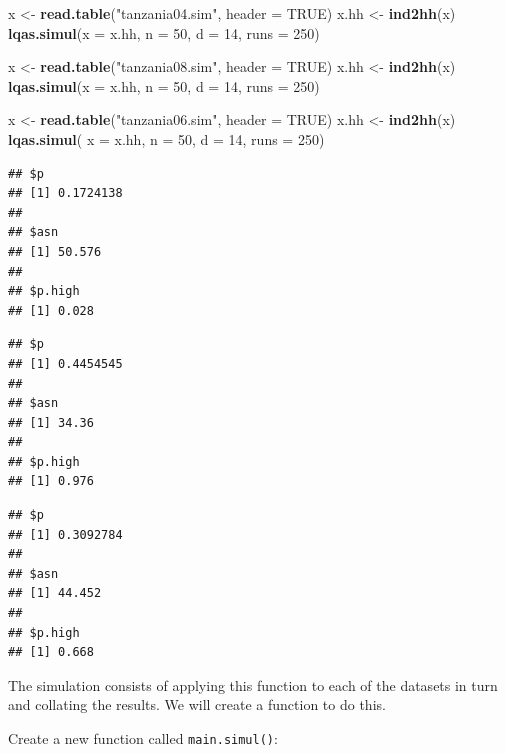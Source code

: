 \documentclass[12pt,a4paper]{book}
\newenvironment{Shaded}{\begin{snugshade}}{\end{snugshade}}
\newcommand{\DataTypeTok}[1]{\textcolor[rgb]{0.13,0.29,0.53}{#1}}
\newcommand{\DecValTok}[1]{\textcolor[rgb]{0.00,0.00,0.81}{#1}}
\newcommand{\KeywordTok}[1]{\textcolor[rgb]{0.13,0.29,0.53}{\textbf{#1}}}
\newcommand{\NormalTok}[1]{#1}
\newcommand{\OtherTok}[1]{\textcolor[rgb]{0.56,0.35,0.01}{#1}}
\newcommand{\StringTok}[1]{\textcolor[rgb]{0.31,0.60,0.02}{#1}}
\theoremstyle{definition}
\theoremstyle{definition}
\theoremstyle{definition}
\theoremstyle{remark}
\begin{document}
\begin{Shaded}
\begin{Highlighting}[]
\NormalTok{x <-}\StringTok{ }\KeywordTok{read.table}\NormalTok{(}\StringTok{"tanzania04.sim"}\NormalTok{, }\DataTypeTok{header =} \OtherTok{TRUE}\NormalTok{)}
\NormalTok{x.hh <-}\StringTok{ }\KeywordTok{ind2hh}\NormalTok{(x)}
\KeywordTok{lqas.simul}\NormalTok{(}\DataTypeTok{x =}\NormalTok{ x.hh, }\DataTypeTok{n =} \DecValTok{50}\NormalTok{, }\DataTypeTok{d =} \DecValTok{14}\NormalTok{, }\DataTypeTok{runs =} \DecValTok{250}\NormalTok{)}

\NormalTok{x <-}\StringTok{ }\KeywordTok{read.table}\NormalTok{(}\StringTok{"tanzania08.sim"}\NormalTok{, }\DataTypeTok{header =} \OtherTok{TRUE}\NormalTok{)}
\NormalTok{x.hh <-}\StringTok{ }\KeywordTok{ind2hh}\NormalTok{(x)}
\KeywordTok{lqas.simul}\NormalTok{(}\DataTypeTok{x =}\NormalTok{ x.hh, }\DataTypeTok{n =} \DecValTok{50}\NormalTok{, }\DataTypeTok{d =} \DecValTok{14}\NormalTok{, }\DataTypeTok{runs =} \DecValTok{250}\NormalTok{)}

\NormalTok{x <-}\StringTok{ }\KeywordTok{read.table}\NormalTok{(}\StringTok{"tanzania06.sim"}\NormalTok{, }\DataTypeTok{header =} \OtherTok{TRUE}\NormalTok{)}
\NormalTok{x.hh <-}\StringTok{ }\KeywordTok{ind2hh}\NormalTok{(x)}
\KeywordTok{lqas.simul}\NormalTok{( }\DataTypeTok{x =}\NormalTok{ x.hh, }\DataTypeTok{n =} \DecValTok{50}\NormalTok{, }\DataTypeTok{d =} \DecValTok{14}\NormalTok{, }\DataTypeTok{runs =} \DecValTok{250}\NormalTok{)}
\end{Highlighting}
\end{Shaded}

\begin{verbatim}
## $p
## [1] 0.1724138
## 
## $asn
## [1] 50.576
## 
## $p.high
## [1] 0.028
\end{verbatim}

\begin{verbatim}
## $p
## [1] 0.4454545
## 
## $asn
## [1] 34.36
## 
## $p.high
## [1] 0.976
\end{verbatim}

\begin{verbatim}
## $p
## [1] 0.3092784
## 
## $asn
## [1] 44.452
## 
## $p.high
## [1] 0.668
\end{verbatim}

The simulation consists of applying this function to each of the
datasets in turn and collating the results. We will create a function to
do this.

Create a new function called \texttt{main.simul()}:
\end{document}

